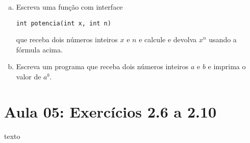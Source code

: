 \documentclass[a4paper,10pt]{article}
\begin{document}
\begin{enumerate}
  
  
  
  
  \begin{enumerate}[(a)]
  \item Escreva uma função com interface

\begin{lstlisting}
int potencia(int x, int n)
\end{lstlisting}

que receba dois números inteiros $x$ e $n$ e calcule e devolva $x^n$ usando a fórmula acima.
  
\item Escreva um programa que receba dois números inteiros $a$ e $b$ e imprima o valor de $a^b$.
  \end{enumerate}



\end{enumerate} %




\newpage
\section{Aula 05: Exercícios 2.6 a 2.10}

texto
\end{document}
